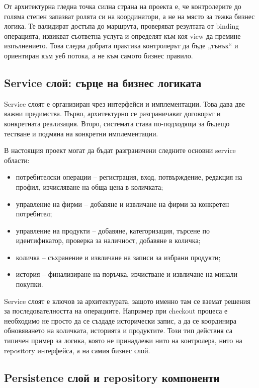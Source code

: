 От архитектурна гледна точка силна страна на проекта е, че контролерите до голяма степен запазват ролята си на координатори, а не на място за тежка бизнес логика. Те валидират достъпа до маршрута, проверяват резултата от binding операцията, извикват съответна услуга и определят към коя view да премине изпълнението. Това следва добрата практика контролерът да бъде „тънък“ и ориентиран към уеб потока, а не към самото бизнес правило.

\subsection{Service слой: сърце на бизнес логиката}

Service слоят е организиран чрез интерфейси и имплементации. Това дава две важни предимства. Първо, архитектурно се разграничават договорът и конкретната реализация. Второ, системата става по-подходяща за бъдещо тестване и подмяна на конкретни имплементации.

В настоящия проект могат да бъдат разграничени следните основни service области:

\begin{itemize}[leftmargin=*]
    \item потребителски операции -- регистрация, вход, потвърждение, редакция на профил, изчисляване на обща цена в количката;
    \item управление на фирми -- добавяне и извличане на фирми за конкретен потребител;
    \item управление на продукти -- добавяне, категоризация, търсене по идентификатор, проверка за наличност, добавяне в количка;
    \item количка -- съхранение и извличане на записи за избрани продукти;
    \item история -- финализиране на поръчка, изчистване и извличане на минали покупки.
\end{itemize}

Service слоят е ключов за архитектурата, защото именно там се вземат решения за последователността на операциите. Например при checkout процеса е необходимо не просто да се създаде исторически запис, а да се координира обновяването на количката, историята и продуктите. Този тип действия са типичен пример за логика, която не принадлежи нито на контролера, нито на repository интерфейса, а на самия бизнес слой.

\subsection{Persistence слой и repository компоненти}


